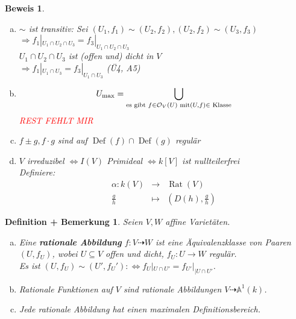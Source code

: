 \documentclass[a4paper,12pt]{report}
\theoremstyle{break}
\newtheorem{DefBem}[Def]{Definition + Bemerkung}
\theoremstyle{nonumberbreak}
\newtheorem{Bew}{Beweis}
\theoremstyle{nonumberplain}
\newcommand{\emp}[1]{\textbf{\emph{#1}}}
\newcommand{\begriff}[1]{{\index{#1}}\emp{#1}}
\DeclareMathOperator{\Ddef}{Def}%
\DeclareMathOperator{\Rat}{Rat}
\newcommand{\calO}{\mathcal{O}}
\begin{document}
\begin{Bew}\begin{enumerate}[a)]
\item
	$\sim$ ist transitiv: Sei $(U_1,f_1)\sim(U_2,f_2), (U_2,f_2)\sim(U_3,f_3)$\\
	$\Rightarrow f_1|_{U_1\cap U_2\cap U_3}=f_3|_{U_1\cap U_2\cap U_3}$\\
	$U_1\cap U_2 \cap U_3$ ist (offen und) \emph{dicht} in $V$\\
	$\Rightarrow f_1|_{U_1\cap U_3} = f_3|_{U_1\cap U_3}$ (\"U4, A5)
\item
	\[U_{\max}=\bigcup_{\textrm{es gibt }f\in \calO_V(U)\\ \textrm{ mit} (U,f)\in \textrm{ Klasse}}\]
	\textcolor{red}{REST FEHLT MIR}
\item
	$f\pm g, f\cdot g$ sind auf $\Ddef(f)\cap\Ddef(g)$ regul\"ar
\item
	$V$ irreduzibel $\Leftrightarrow I(V)$ Primideal $\Leftrightarrow k[V]$ ist nullteilerfrei\\
	Definiere:\[\begin{array}{rcl}
		\alpha:k(V) &\to& \Rat(V)\\
		\frac{g}{h} &\mapsto& (D(h),\frac{g}{h})\end{array}\]
	\end{enumerate}\end{Bew}

\begin{DefBem}\label{bem7.2}
Seien $V,W$ affine Variet\"aten.\begin{enumerate}[a)]
\item
	Eine \begriff{rationale Abbildung} $f:V\dashrightarrow W$ ist eine \"Aquivalenzklasse von Paaren $(U,f_U)$, wobei $U\subseteq V$ offen und dicht, $f_U:U\longrightarrow W$ regul\"ar.\\
	Es ist $(U,f_U)\sim (U',f_U'):\Leftrightarrow f_U|_{U\cap U'}=f_{U'}|_{\vert U\cap U'}$.
\item
	Rationale Funktionen auf $V$ sind rationale Abbildungen $V\dashrightarrow \mathbb A^1(k)$.
\item
	Jede rationale Abbildung hat einen maximalen Definitionsbereich.
\end{enumerate}\end{DefBem}
\end{document}
